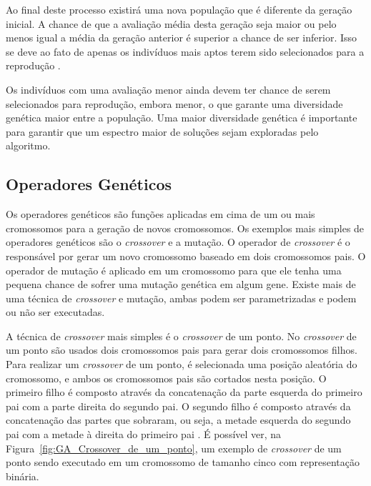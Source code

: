 \documentclass[12pt,oneside,a4paper,english,french,spanish,brazil,]{abntex2}
\begin{document}
Ao final deste processo existirá uma nova população que é diferente da geração inicial. A chance de que a avaliação média desta geração seja maior ou pelo menos igual a média da geração anterior é superior a chance de ser inferior. Isso se deve ao fato de apenas os indivíduos mais aptos terem sido selecionados para a reprodução \cite{linden:2008}.

Os indivíduos com uma avaliação menor ainda devem ter chance de serem selecionados para reprodução, embora menor, o que garante uma diversidade genética maior entre a população. Uma maior diversidade genética é importante para garantir que um espectro maior de soluções sejam exploradas pelo algoritmo.

\subsection{Operadores Genéticos}

Os operadores genéticos são funções aplicadas em cima de um ou mais cromossomos para a geração de novos cromossomos. Os exemplos mais simples de operadores genéticos são o \textit{crossover} e a mutação. O operador de \textit{crossover} é o responsável por gerar um novo cromossomo baseado em dois cromossomos pais. O operador de mutação é aplicado em um cromossomo para que ele tenha uma pequena chance de sofrer uma mutação genética em algum gene. Existe mais de uma técnica de \textit{crossover} e mutação, ambas podem ser parametrizadas e podem ou não ser executadas.

A técnica de \textit{crossover} mais simples é o \textit{crossover} de um ponto. No \textit{crossover} de um ponto são usados dois cromossomos pais para gerar dois cromossomos filhos. Para realizar um \textit{crossover} de um ponto, é selecionada uma posição aleatória do cromossomo, e ambos os cromossomos pais são cortados nesta posição. O primeiro filho é composto através da concatenação da parte esquerda do primeiro pai com a parte direita do segundo pai. O segundo filho é composto através da concatenação das partes que sobraram, ou seja, a metade esquerda do segundo pai com a metade à direita do primeiro pai \cite{linden:2008}. É possível ver, na Figura~\ref{fig:GA_Crossover_de_um_ponto}, um exemplo de \textit{crossover}  de um ponto sendo executado em um cromossomo de tamanho cinco com representação binária.
\end{document}
